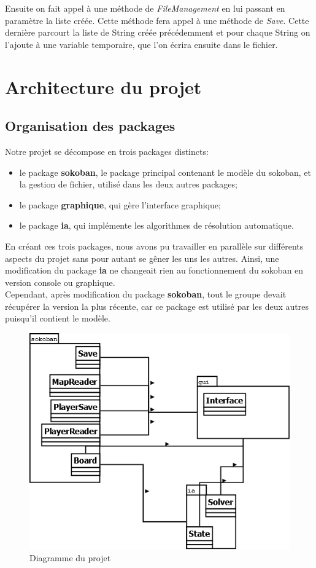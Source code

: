\documentclass[a4paper,12pt]{article} %
\begin{document}
Ensuite on fait appel à une méthode de \textit{FileManagement} en lui passant en paramètre la liste créée. Cette méthode fera appel à une méthode de \textit{Save}. Cette dernière parcourt la liste de String créée précédemment et pour chaque String on l'ajoute à une variable temporaire, que l'on écrira ensuite dans le fichier.

\section{Architecture du projet}

\subsection{Organisation des packages}

Notre projet se décompose en trois packages distincts:
\begin{itemize}
\item le package \textbf{sokoban}, le package principal contenant le modèle du sokoban, et la gestion de fichier, utilisé dans les deux autres packages;
\item le package \textbf{graphique}, qui gère l'interface graphique;
\item le package \textbf{ia}, qui implémente les algorithmes de résolution automatique.
\end{itemize}

En créant ces trois packages, nous avons pu travailler en parallèle sur différents aspects du projet sans pour autant se gêner les uns les autres.
Ainsi, une modification du package \textbf{ia} ne changeait rien au fonctionnement du sokoban en version console ou graphique.\\
Cependant, après modification du package \textbf{sokoban}, tout le groupe devait récupérer la version la plus récente, car ce package est utilisé par les deux autres puisqu'il contient le modèle.

\begin{figure}[!h]
\centering
\includegraphics[scale=0.3]{images/packages.png}
\caption{Diagramme du projet}
\end{figure}
\end{document}
